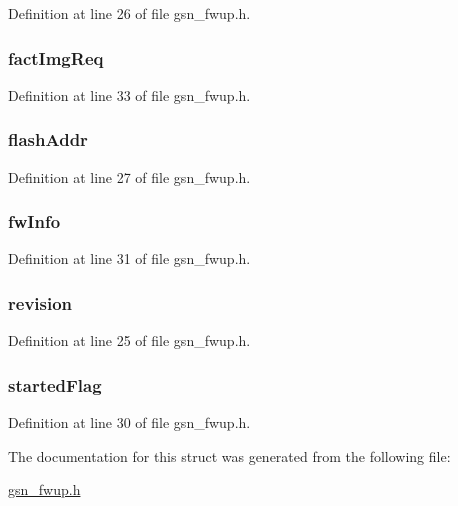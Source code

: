 Definition at line 26 of file gsn\_\-fwup.h.

\hypertarget{a00082_a3f957f5cb73cf34d2f46335938ac9ba8}{
\subsubsection[{factImgReq}]{ {\bf factImgReq}}}
\label{a00082_a3f957f5cb73cf34d2f46335938ac9ba8}


Definition at line 33 of file gsn\_\-fwup.h.

\hypertarget{a00082_af3fae94809cef9bd6c5e106b985a95d3}{
\subsubsection[{flashAddr}]{ {\bf flashAddr}}}
\label{a00082_af3fae94809cef9bd6c5e106b985a95d3}


Definition at line 27 of file gsn\_\-fwup.h.

\hypertarget{a00082_a4962d370920459d556cb3c7ca1399475}{
\subsubsection[{fwInfo}]{ {\bf fwInfo}}}
\label{a00082_a4962d370920459d556cb3c7ca1399475}


Definition at line 31 of file gsn\_\-fwup.h.

\hypertarget{a00082_adb927f9d46b9a2bb19fbe22051bb7bfc}{
\subsubsection[{revision}]{ {\bf revision}}}
\label{a00082_adb927f9d46b9a2bb19fbe22051bb7bfc}


Definition at line 25 of file gsn\_\-fwup.h.

\hypertarget{a00082_aabd9d04d5a2eea283732ed35b01fa6b0}{
\subsubsection[{startedFlag}]{ {\bf startedFlag}}}
\label{a00082_aabd9d04d5a2eea283732ed35b01fa6b0}


Definition at line 30 of file gsn\_\-fwup.h.



The documentation for this struct was generated from the following file:\begin{DoxyCompactItemize}
\item 
\hyperlink{a00502}{gsn\_\-fwup.h}\end{DoxyCompactItemize}
